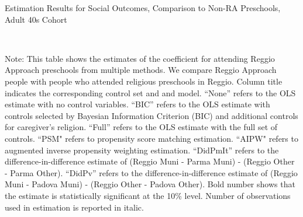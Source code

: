 \begin{table}[H] \caption{Estimation Results for Social Outcomes, Comparison to Non-RA Preschools, Adult 40s Cohort} \label{ols-S-adult40-reg-other}
\scalebox{0.8}{}
\vspace{1ex} \\
\footnotesize\raggedright{Note: This table shows the estimates of the coefficient for attending Reggio Approach preschools from multiple methods. We compare Reggio Approach people with people who attended religious preschools in Reggio. Column title indicates the corresponding control set and and model. ``None'' refers to the OLS estimate with no control variables. ``BIC'' refers to the OLS estimate with controls selected by Bayesian Information Criterion (BIC) and additional controls for caregiver's religion. ``Full'' refers to the OLS estimate with the full set of controls. ``PSM" refers to propensity score matching estimation. ``AIPW" refers to augmented inverse propensity weighting estimation. ``DidPmIt'' refers to the difference-in-difference estimate of (Reggio Muni - Parma Muni) - (Reggio Other - Parma Other). ``DidPv'' refers to the difference-in-difference estimate of (Reggio Muni - Padova Muni) - (Reggio Other - Padova Other). Bold number shows that the estimate is statistically significant at the 10\% level. Number of observations used in estimation is reported in italic.}
\end{table}

